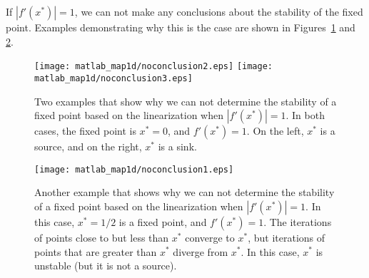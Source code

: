 \bigskip
If $|f'(x^*)|=1$, we can not make any conclusions about the
stability of the fixed point.  Examples demonstrating why this
is the case are shown in Figures~\ref{fig:noconclusion2}
and \ref{fig:noconclusion1}.
%
\begin{figure}
\centerline{%
\texttt{[image: matlab\_map1d/noconclusion2.eps]}%
\texttt{[image: matlab\_map1d/noconclusion3.eps]}%
}
\caption{Two examples that show why we can not determine
the stability of a fixed point based on the linearization
when
$|f'(x^*)|=1$.  In both cases, the fixed point is $x^*=0$, and $f'(x^*)=1$.
On the left, $x^*$ is a source, and on the right, $x^*$ is a sink.}
\label{fig:noconclusion2}
\end{figure}
%
%
\begin{figure}
\centerline{%
\texttt{[image: matlab\_map1d/noconclusion1.eps]}%
}
\caption{Another example that shows why we can not determine
the stability of a fixed point based on the linearization
when
$|f'(x^*)|=1$.  In this case, $x^*=1/2$ is a fixed point,
and $f'(x^*)=1$.
The iterations of points close to but less than $x^*$
converge to $x^*$, but iterations of points that are
greater than $x^*$ diverge from $x^*$.
In this case, $x^*$ is unstable (but it is not a source).
}
\label{fig:noconclusion1}
\end{figure}
%
%
% 
%
%
\newpage
%
